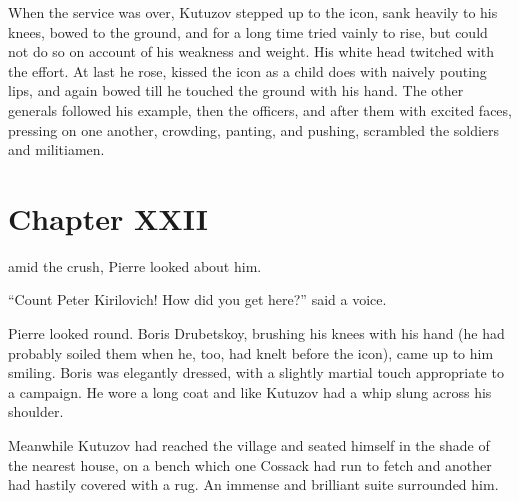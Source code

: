 When the service was over, Kutuzov stepped up to the icon, sank
heavily to his knees, bowed to the ground, and for a long time
tried vainly to rise, but could not do so on account of his
weakness and weight. His white head twitched with the effort. At
last he rose, kissed the icon as a child does with naively
pouting lips, and again bowed till he touched the ground with his
hand. The other generals followed his example, then the officers,
and after them with excited faces, pressing on one another,
crowding, panting, and pushing, scrambled the soldiers and
militiamen.


\chapter*{Chapter XXII} \ifaudio {}
\fi

 amid the crush, Pierre looked about him.

``Count Peter Kirilovich! How did you get here?'' said a voice.

Pierre looked round. Boris Drubetskoy, brushing his knees with
his hand (he had probably soiled them when he, too, had knelt
before the icon), came up to him smiling. Boris was elegantly
dressed, with a slightly martial touch appropriate to a
campaign. He wore a long coat and like Kutuzov had a whip slung
across his shoulder.

Meanwhile Kutuzov had reached the village and seated himself in
the shade of the nearest house, on a bench which one Cossack had
run to fetch and another had hastily covered with a rug. An
immense and brilliant suite surrounded him.

